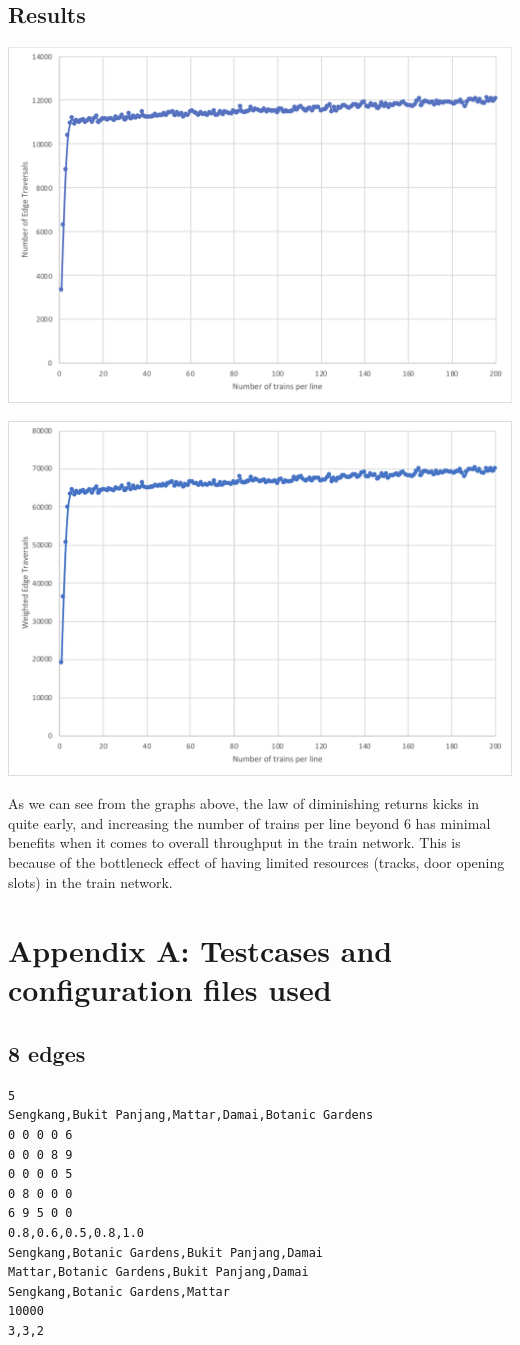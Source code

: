 \documentclass[a4paper,12pt]{article}
\begin{document}
\subsection{Results}
\begin{center}
	\includegraphics[width=0.65\linewidth]{edge-chart}
\end{center}
\begin{center}
	\includegraphics[width=0.65\linewidth]{weighted-edge-chart}
\end{center}

As we can see from the graphs above, the law of diminishing returns kicks in quite early, and increasing the number of trains per line beyond 6 has minimal benefits when it comes to overall throughput in the train network. This is because of the bottleneck effect of having limited resources (tracks, door opening slots) in the train network.

\newpage

\section*{Appendix A: Testcases and configuration files used}
\subsection*{8 edges}
\begin{verbatim}
5
Sengkang,Bukit Panjang,Mattar,Damai,Botanic Gardens
0 0 0 0 6
0 0 0 8 9
0 0 0 0 5
0 8 0 0 0
6 9 5 0 0
0.8,0.6,0.5,0.8,1.0
Sengkang,Botanic Gardens,Bukit Panjang,Damai
Mattar,Botanic Gardens,Bukit Panjang,Damai
Sengkang,Botanic Gardens,Mattar
10000
3,3,2
\end{verbatim}
\end{document}
